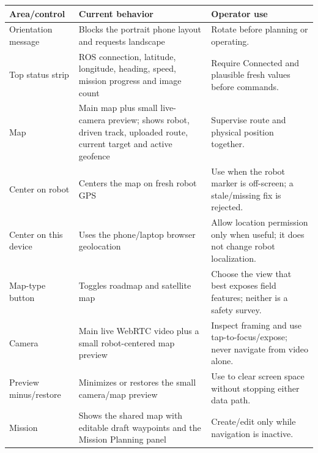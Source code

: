 \documentclass[
  10pt,
  letterpaper,
  openany]{report}
\newcounter{none} %
\begin{document}
{\def\LTcaptype{none} %
\begin{longtable}[]{@{}
  >{\raggedright\arraybackslash}p{}
  >{\raggedright\arraybackslash}p{}
  >{\raggedright\arraybackslash}p{}@{}}
\toprule\noalign{}
\begin{minipage}[b]{\linewidth}\raggedright
Area/control
\end{minipage} & \begin{minipage}[b]{\linewidth}\raggedright
Current behavior
\end{minipage} & \begin{minipage}[b]{\linewidth}\raggedright
Operator use
\end{minipage} \\
\midrule\noalign{}
\endhead
\bottomrule\noalign{}
\endlastfoot
Orientation message & Blocks the portrait phone layout and requests
landscape & Rotate before planning or operating. \\
Top status strip & ROS connection, latitude, longitude, heading, speed,
mission progress and image count & Require Connected and plausible fresh
values before commands. \\
Map & Main map plus small live-camera preview; shows robot, driven
track, uploaded route, current target and active geofence & Supervise
route and physical position together. \\
Center on robot & Centers the map on fresh robot GPS & Use when the
robot marker is off-screen; a stale/missing fix is rejected. \\
Center on this device & Uses the phone/laptop browser geolocation &
Allow location permission only when useful; it does not change robot
localization. \\
Map-type button & Toggles roadmap and satellite map & Choose the view
that best exposes field features; neither is a safety survey. \\
Camera & Main live WebRTC video plus a small robot-centered map preview
& Inspect framing and use tap-to-focus/expose; never navigate from video
alone. \\
Preview minus/restore & Minimizes or restores the small camera/map
preview & Use to clear screen space without stopping either data
path. \\
Mission & Shows the shared map with editable draft waypoints and the
Mission Planning panel & Create/edit only while navigation is
inactive. \\

\end{longtable}}
\end{document}

